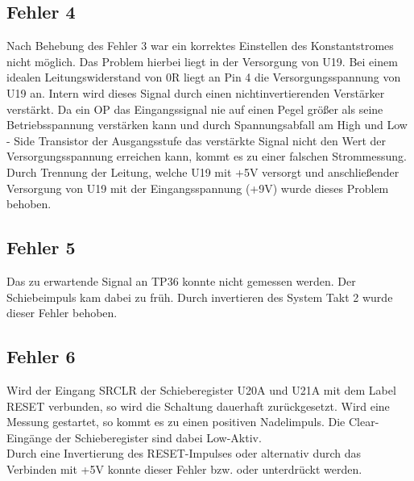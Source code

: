 \subsection{Fehler 4}

Nach Behebung des \glqq Fehler 3 \grqq{} war ein korrektes Einstellen des Konstantstromes nicht möglich. Das Problem hierbei liegt in der Versorgung von U19. Bei einem idealen Leitungswiderstand von 0R liegt an Pin 4 die Versorgungsspannung von U19 an. Intern wird dieses Signal durch einen \glqq nichtinvertierenden Verstärker \grqq{} verstärkt. Da ein OP das Eingangssignal nie auf einen Pegel größer als seine Betriebsspannung verstärken kann und durch Spannungsabfall am \glqq High und Low - Side Transistor\grqq{} der Ausgangsstufe das verstärkte Signal nicht den Wert der Versorgungsspannung erreichen kann, kommt es zu einer falschen Strommessung. Durch Trennung der Leitung, welche U19 mit +5V versorgt und anschließender Versorgung von U19 mit der Eingangsspannung (+9V) wurde dieses Problem behoben. 

\newpage

\subsection{Fehler 5}

Das zu erwartende Signal an TP36 konnte nicht gemessen werden. Der Schiebeimpuls kam dabei zu früh. Durch invertieren des \glqq System Takt 2 \grqq{} wurde dieser Fehler behoben.



\subsection{Fehler 6}


Wird der Eingang \glqq SRCLR \grqq{} der Schieberegister U20A und U21A mit dem Label \glqq RESET \grqq{} verbunden, so wird die Schaltung dauerhaft zurückgesetzt. 
Wird eine Messung gestartet, so kommt es zu einen positiven Nadelimpuls. Die \glqq Clear-Eingänge \grqq{} der Schieberegister sind dabei Low-Aktiv. 
\\
Durch eine Invertierung des RESET-Impulses oder alternativ durch das Verbinden mit +5V konnte dieser Fehler bzw. oder unterdrückt werden.
